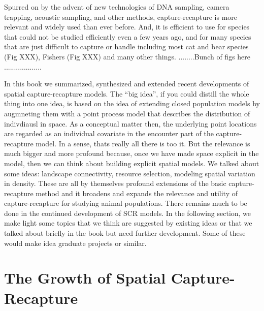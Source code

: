 Spurred on by the advent of new technologies of DNA sampling, camera
trapping, acoustic sampling, and other methods, 
capture-recapture is more relevant and widely used than ever before.
And, it is efficient to use for 
species that could not be studied efficiently even a few years
ago, and for many species
that are just difficult to capture or handle including
most cat and bear species (Fig XXX), Fishers (Fig XXX) and many other
things. ........Bunch of figs here ...................

In this book we summarized, synthesized and extended recent
developments of spatial capture-recapture models.  The ``big idea'',
if you could distill the whole thing into one idea, is based on the
idea of extending closed population models by augmneting them with a
point process model that describes the distribution of indivdiausl
\citep{efford:2004} in space. As a conceptual matter then, the
underlying point locations are regarded as an individual covariate in
the encounter part of the capture-recapture model. In a sense, thats
really all there is too it. But the relevance is much bigger and more
profound because, once we have made space explicit in the model, then
we can think about building explicit spatial models.  We talked about
some ideas: landscape connectivity, resource selection, modeling
spatial variation in density. These are all by themselves profound
extensions of the basic capture-recapture method and it broadens and
expands the relevance and utility of capture-recapture for studying
animal populations.  There remains much to be done in the continued
development of SCR models. In the following section, we make light
some topics that we think are suggested by existing ideas or that we
talked about briefly in the book but need further development. Some of
these would make idea graduate projects or similar.


\section{The Growth of Spatial Capture-Recapture}

